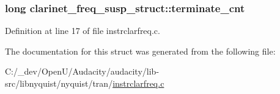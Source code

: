 \subsubsection[{\texorpdfstring{terminate\+\_\+cnt}{terminate_cnt}}]{\setlength{\rightskip}{0pt plus 5cm}long clarinet\+\_\+freq\+\_\+susp\+\_\+struct\+::terminate\+\_\+cnt}\hypertarget{structclarinet__freq__susp__struct_ad4753740d649fc1d73e14946f3a03f03}{}\label{structclarinet__freq__susp__struct_ad4753740d649fc1d73e14946f3a03f03}


Definition at line 17 of file instrclarfreq.\+c.



The documentation for this struct was generated from the following file\+:\begin{DoxyCompactItemize}
\item 
C\+:/\+\_\+dev/\+Open\+U/\+Audacity/audacity/lib-\/src/libnyquist/nyquist/tran/\hyperlink{instrclarfreq_8c}{instrclarfreq.\+c}\end{DoxyCompactItemize}
